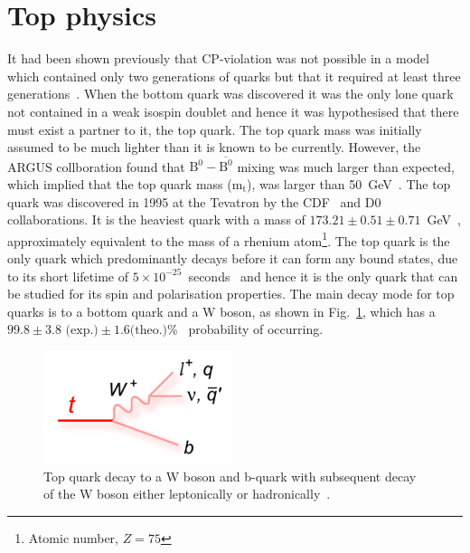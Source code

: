 \section{Top physics}
It had been shown previously that CP-violation was not possible in a model which contained only two generations of quarks but that it required at least three generations~\cite{Kobayashi:1973fv}. When the bottom quark was discovered it was the only lone quark not contained in a weak isospin doublet and hence it was hypothesised that there must exist a partner to it, the top quark. The top quark mass was initially assumed to be much lighter than it is known to be currently. However, the ARGUS collboration found that $\textrm{B}^{0}-\overline{\textrm{B}^{0}}$ mixing was much larger than expected, which implied that the top quark mass ($\textrm{m}_\textrm{t}$), was larger than 50~GeV~\cite{ARGUS,ARGUSinterpretation}. 
The top quark was discovered in 1995 at the Tevatron by the CDF~\cite{PhysRevLett.74.2626} and D0~\cite{Abachi:1995iq} collaborations.  It is the heaviest quark with a mass of $173.21\pm0.51\pm0.71$~GeV~\cite{PDG2016}, approximately equivalent to the mass of a rhenium atom\footnote{Atomic number, $Z = 75$}. The top quark is the only quark which predominantly decays before it can form any bound states, due to its short lifetime of $5\times10^{-25}$~seconds~\cite{PDG2016} and hence it is the only quark that can be studied for its spin and polarisation properties. The main decay mode for top quarks is to a bottom quark and a W boson, as shown in Fig.~\ref{fig:tdecay}, which has a $99.8\pm3.8\textrm{ (exp.)}\pm1.6\textrm {(theo.)} \%$~\cite{2014arXiv1403.7366C} probability of occurring.
\begin{figure}[ht!]
\begin{center}
    \includegraphics[width=0.49\textwidth]{images/Theory/topdecay.png}
    \caption{Top quark decay to a W boson and b-quark with subsequent decay of the W boson either leptonically or hadronically~\cite{tdecaysource}.}
    \label{fig:tdecay}
\end{center}
\end{figure}

